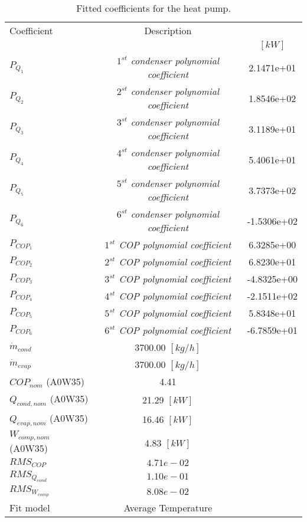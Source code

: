 \documentclass[english]{SPFShortReport}
\author{Dani Carbonell}
\begin{document}
\begin{table}[!ht]
\begin{small}
\caption{Fitted coefficients for the heat pump.}
\begin{center}
\resizebox{12cm}{!} 
{
\begin{tabular}{l | c c } 
\hline
\hline
Coefficient &Description & \\ 
 & &$[kW]$\\ 
\hline
$P_{Q_{1}}$ & \emph{$1^{st}$ condenser polynomial coefficient}  & 2.1471e+01    \\ 
$P_{Q_{2}}$ & \emph{$2^{st}$ condenser polynomial coefficient}  & 1.8546e+02    \\ 
$P_{Q_{3}}$ & \emph{$3^{st}$ condenser polynomial coefficient}  & 3.1189e+01    \\ 
$P_{Q_{4}}$ & \emph{$4^{st}$ condenser polynomial coefficient}  & 5.4061e+01    \\ 
$P_{Q_{5}}$ & \emph{$5^{st}$ condenser polynomial coefficient}  & 3.7373e+02    \\ 
$P_{Q_{6}}$ & \emph{$6^{st}$ condenser polynomial coefficient}  & -1.5306e+02    \\ 
\hline
$P_{COP_{1}}$ & \emph{$1^{st}$ COP polynomial coefficient}  & 6.3285e+00    \\ 
$P_{COP_{2}}$ & \emph{$2^{st}$ COP polynomial coefficient}  & 6.8230e+01    \\ 
$P_{COP_{3}}$ & \emph{$3^{st}$ COP polynomial coefficient}  & -4.8325e+00    \\ 
$P_{COP_{4}}$ & \emph{$4^{st}$ COP polynomial coefficient}  & -2.1511e+02    \\ 
$P_{COP_{5}}$ & \emph{$5^{st}$ COP polynomial coefficient}  & 5.8348e+01    \\ 
$P_{COP_{6}}$ & \emph{$6^{st}$ COP polynomial coefficient}  & -6.7859e+01    \\ 
\hline
$\dot m_{cond}$ & 3700.00 $[kg/h]$ \\ 
$\dot m_{evap}$ & 3700.00 $[kg/h]$ \\ 
\hline
$COP_{nom}$ (A0W35)& 4.41 \\ 
$Q_{cond,nom}$ (A0W35)& 21.29 $[kW]$\\ 
$Q_{evap,nom}$ (A0W35)& 16.46 $[kW]$\\ 
$W_{comp,nom}$ (A0W35)& 4.83 $[kW]$\\ 
\hline
 $RMS_{COP}$ & $4.71e-02$ \\ 
 $RMS_{Q_{cond}}$ & $1.10e-01$ \\ 
 $RMS_{W_{comp}}$ & $8.08e-02$ \\ 
\hline
Fit model & Average Temperature\\ 
\hline
\hline
\end{tabular}
}
\label{CoefTable}
\end{center}
\end{small}
\end{table}
\end{document}
